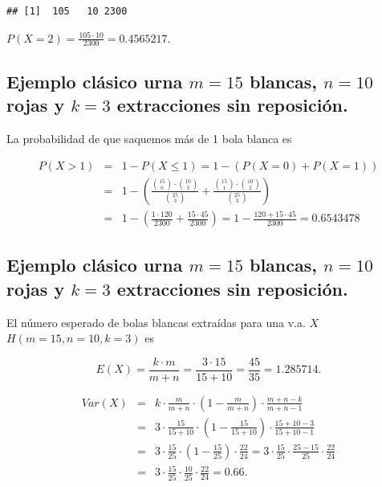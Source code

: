 \documentclass[]{book}
\begin{document}
\begin{verbatim}
## [1]  105   10 2300
\end{verbatim}

\(P(X=2)=\frac{105\cdot10 }{2300}=0.4565217.\)

\hypertarget{ejemplo-cluxe1sico-urna-m15-blancas-n10-rojas-y-k3-extracciones-sin-reposiciuxf3n.-2}{%
\subsection{\texorpdfstring{Ejemplo clásico urna \(m=15\) blancas, \(n=10\) rojas y \(k=3\) extracciones sin reposición.}{Ejemplo clásico urna m=15 blancas, n=10 rojas y k=3 extracciones sin reposición.}}\label{ejemplo-cluxe1sico-urna-m15-blancas-n10-rojas-y-k3-extracciones-sin-reposiciuxf3n.-2}}

La probabilidad de que saquemos más de 1 bola blanca es

\[
\begin{eqnarray*}
P(X> 1)&=& 1-P(X\leq 1)=1-(P(X=0)+P(X=1))\\
&=&
1-\left(\frac{\binom{15}{0}\cdot \binom{10}{3}}{\binom{25}{3}}+
\frac{\binom{15}{1}\cdot \binom{10}{2}}{\binom{25}{3}}\right)\\
&=&
1-\left(
\frac{1\cdot120 }{2300}+\frac{15\cdot45 }{2300}
\right)=1-\frac{120+15\cdot 45}{2300}=0.6543478
\end{eqnarray*}
\]

\hypertarget{ejemplo-cluxe1sico-urna-m15-blancas-n10-rojas-y-k3-extracciones-sin-reposiciuxf3n.-3}{%
\subsection{\texorpdfstring{Ejemplo clásico urna \(m=15\) blancas, \(n=10\) rojas y \(k=3\) extracciones sin reposición.}{Ejemplo clásico urna m=15 blancas, n=10 rojas y k=3 extracciones sin reposición.}}\label{ejemplo-cluxe1sico-urna-m15-blancas-n10-rojas-y-k3-extracciones-sin-reposiciuxf3n.-3}}

El número esperado de bolas blancas extraídas para una v.a. \(X\) \(H(m=15,n=10,k=3)\) es

\[E(X)=\frac{k\cdot m}{m+n}=\frac{3\cdot 15}{15+10}=\frac{45}{35}=1.285714.\]

\[
\begin{eqnarray*}
Var(X)&=&k\cdot\frac{m}{m+n}\cdot\left(1-\frac{m}{m+n}\right) \cdot\frac{m+n-k}{m+n-1}\\
&=&3\cdot\frac{15}{15+10}\cdot\left(1-\frac{15}{15+10}\right) \cdot\frac{15+10-3}{15+10-1}\\
&=&
3\cdot\frac{15}{25}\cdot\left(1-\frac{15}{25}\right) \cdot\frac{22}{24}= 
3\cdot\frac{15}{25}\cdot\frac{25-15}{25} \cdot\frac{22}{24}\\
&=&
3\cdot\frac{15}{25}\cdot\frac{10}{25}\cdot\frac{22}{24}=0.66.
\end{eqnarray*}
\]
\end{document}
